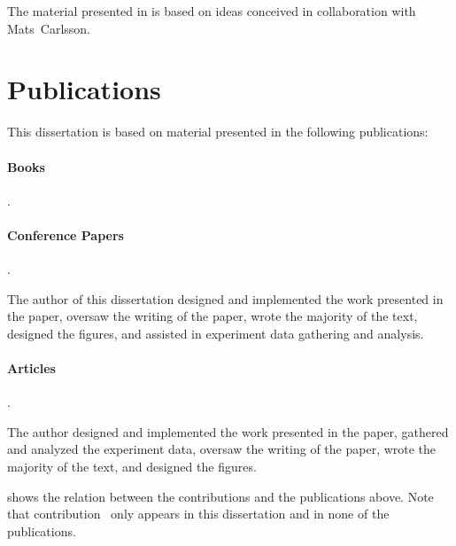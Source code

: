 The material presented in  is based on ideas
conceived in collaboration with Mats~Carlsson.


\section{Publications}

This dissertation is based on material presented in the following publications:


\paragraph{Books}

\begin{publications}
  \item {}
    .
\end{publications}


\paragraph{Conference Papers}

\begin{publications}[resume]
  \item {}
    .
    \begin{authorsContribution}
      The author of this dissertation designed and implemented the work
      presented in the paper, oversaw the writing of the paper, wrote the
      majority of the text, designed the figures, and assisted in experiment
      data gathering and analysis.
    \end{authorsContribution}
\end{publications}


\paragraph{Articles}

\begin{publications}[resume]
  \item {}
    .
    \begin{authorsContribution}
      The author designed and implemented the work presented in the paper,
      gathered and analyzed the experiment data, oversaw the writing of the
      paper, wrote the majority of the text, and designed the figures.
    \end{authorsContribution}
\end{publications}
%
 shows the relation between the
contributions and the publications above.
%
Note that contribution~ only appears in this
dissertation and in none of the publications.

